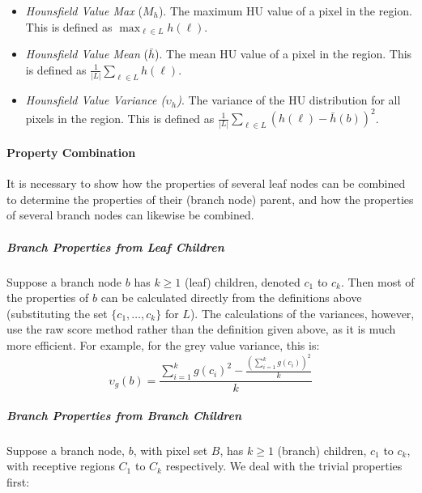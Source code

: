 \begin{itemize}
\item \emph{Hounsfield Value Max} ($M_h$). The maximum HU value of a pixel in the region. This is defined as $\displaystyle \max_{\ell \in L} h(\ell)$.

\item \emph{Hounsfield Value Mean} ($\bar{h}$). The mean HU value of a pixel in the region. This is defined as $\displaystyle \frac{1}{|L|} \sum_{\ell \in L} h(\ell)$.

\item \emph{Hounsfield Value Variance ($\upsilon_h$)}. The variance of the HU distribution for all pixels in the region. This is defined as $\displaystyle \frac{1}{|L|} \sum_{\ell \in L} (h(\ell) - \bar{h}(b))^2$.

\end{itemize}

\enlargethispage*{\baselineskip}

\paragraph{Property Combination}

It is necessary to show how the properties of several leaf nodes can be combined to determine the properties of their (branch node) parent, and how the properties of several branch nodes can likewise be combined.

\subparagraph{Branch Properties from Leaf Children}

Suppose a branch node $b$ has $k \ge 1$ (leaf) children, denoted $c_1$ to $c_k$. Then most of the properties of $b$ can be calculated directly from the definitions above (substituting the set $\{c_1,\ldots,c_k\}$ for $L$). The calculations of the variances, however, use the raw score method rather than the definition given above, as it is much more efficient. For example, for the grey value variance, this is:
%
\[
\upsilon_g(b) = \frac{\sum_{i=1}^k g(c_i)^2 - \frac{(\sum_{i=1}^k g(c_i))^2}{k}}{k}
\]

\subparagraph{Branch Properties from Branch Children}

Suppose a branch node, $b$, with pixel set $B$, has $k \ge 1$ (branch) children, $c_1$ to $c_k$, with receptive regions $C_1$ to $C_k$ respectively. We deal with the trivial properties first:

